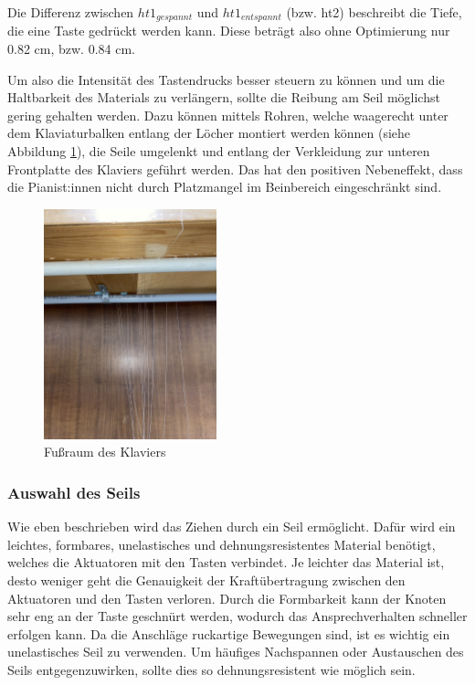 Die Differenz zwischen $ht1_{gespannt}$ und $ht1_{entspannt}$ (bzw. ht2) beschreibt die Tiefe, die eine Taste gedrückt werden kann.
\newline Diese beträgt also ohne Optimierung nur 0.82 cm, bzw. 0.84 cm. %

Um also die Intensität des Tastendrucks besser steuern zu können und um die Haltbarkeit des Materials zu verlängern,
sollte die Reibung am Seil möglichst gering gehalten werden.
Dazu können mittels Rohren, welche waagerecht unter dem Klaviaturbalken entlang der Löcher montiert werden können (siehe Abbildung \ref{fig:fussraum}), die Seile umgelenkt und
entlang der Verkleidung zur unteren Frontplatte des Klaviers geführt werden.
Das hat den positiven Nebeneffekt, dass die Pianist:innen nicht durch Platzmangel im Beinbereich eingeschränkt sind.


\begin{figure}[htbp]
	\centering
	\includegraphics[width=5cm,angle=-90]{img/Fussraum.jpg}
	\caption{Fußraum des Klaviers}
	\label{fig:fussraum}
\end{figure}


\subsubsection{Auswahl des Seils}

Wie eben beschrieben wird das Ziehen durch ein Seil ermöglicht.
Dafür wird ein leichtes, formbares, unelastisches und dehnungsresistentes Material benötigt, welches die Aktuatoren mit den Tasten verbindet.
Je leichter das Material ist, desto weniger geht die Genauigkeit der Kraftübertragung zwischen den Aktuatoren und den Tasten verloren.
Durch die Formbarkeit kann der Knoten sehr eng an der Taste geschnürt werden, wodurch das Ansprechverhalten schneller erfolgen kann.
Da die Anschläge ruckartige Bewegungen sind, ist es wichtig ein unelastisches Seil zu verwenden.
Um häufiges Nachspannen oder Austauschen des Seils entgegenzuwirken, sollte dies so dehnungsresistent wie möglich sein.

